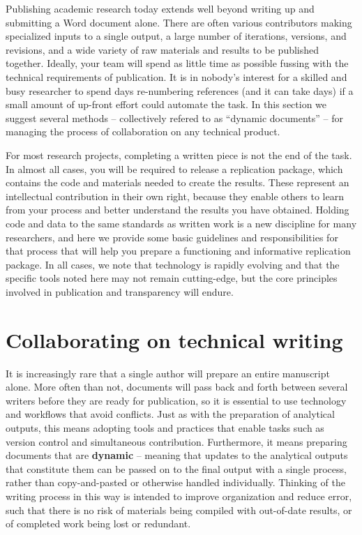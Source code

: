 
\begin{fullwidth}
Publishing academic research today extends well beyond writing up and submitting a Word document alone.
There are often various contributors making specialized inputs to a single output,
a large number of iterations, versions, and revisions,
and a wide variety of raw materials and results to be published together.
Ideally, your team will spend as little time as possible
fussing with the technical requirements of publication.
It is in nobody's interest for a skilled and busy researcher
to spend days re-numbering references (and it can take days)
if a small amount of up-front effort could automate the task.
In this section we suggest several methods --
collectively refered to as ``dynamic documents'' --
for managing the process of collaboration on any technical product.

For most research projects, completing a written piece is not the end of the task.
In almost all cases, you will be required to release a replication package,
which contains the code and materials needed to create the results.
These represent an intellectual contribution in their own right,
because they enable others to learn from your process
and better understand the results you have obtained.
Holding code and data to the same standards as written work
is a new discipline for many researchers,
and here we provide some basic guidelines and responsibilities for that process
that will help you prepare a functioning and informative replication package.
In all cases, we note that technology is rapidly evolving
and that the specific tools noted here may not remain cutting-edge,
but the core principles involved in publication and transparency will endure.
\end{fullwidth}


\section{Collaborating on technical writing}

It is increasingly rare that a single author will prepare an entire manuscript alone.
More often than not, documents will pass back and forth between several writers
before they are ready for publication,
so it is essential to use technology and workflows that avoid conflicts.
Just as with the preparation of analytical outputs,
this means adopting tools and practices that enable tasks
such as version control and simultaneous contribution.
Furthermore, it means preparing documents that are \textbf{dynamic} --
meaning that updates to the analytical outputs that constitute them
can be passed on to the final output with a single process,
rather than copy-and-pasted or otherwise handled individually.
Thinking of the writing process in this way
is intended to improve organization and reduce error,
such that there is no risk of materials being compiled
with out-of-date results, or of completed work being lost or redundant.

